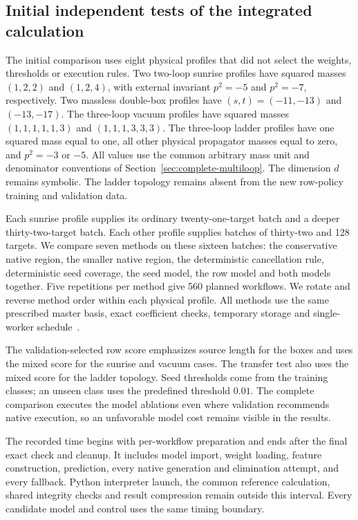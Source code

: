 \subsection{Initial independent tests of the integrated calculation}
The initial comparison uses eight physical profiles that did not select the
weights, thresholds or execution rules. Two two-loop sunrise profiles have
squared masses $(1,2,2)$ and $(1,2,4)$, with external invariant $p^2=-5$ and
$p^2=-7$, respectively. Two massless double-box profiles have
$(s,t)=(-11,-13)$ and $(-13,-17)$. The three-loop vacuum profiles have squared
masses $(1,1,1,1,1,3)$ and $(1,1,1,3,3,3)$. The three-loop ladder profiles have
one squared mass equal to one, all other physical propagator masses equal
to zero, and $p^2=-3$ or $-5$. All values use the common arbitrary mass unit
and denominator conventions of Section~\ref{sec:complete-multiloop}.
The dimension $d$ remains symbolic. The ladder topology remains absent
from the new row-policy training and validation data.

Each sunrise profile supplies its ordinary twenty-one-target batch and
a deeper thirty-two-target batch. Each other profile supplies batches of
thirty-two and 128 targets. We compare seven methods on these sixteen
batches: the conservative native region, the smaller native region,
the deterministic cancellation rule, deterministic seed coverage, the
seed model, the row model and both models together.
Five repetitions per method give 560 planned workflows. We rotate and
reverse method order within each physical profile. All methods use the
same prescribed master basis, exact coefficient checks, temporary storage
and single-worker schedule~\cite{KiraIntegratedRuntimeData}.

The validation-selected row score emphasizes source length for the boxes
and uses the mixed score for the sunrise and vacuum cases. The transfer
test also uses the mixed score for the ladder topology. Seed thresholds
come from the training classes; an unseen class uses the predefined
threshold $0.01$. The complete comparison executes the model ablations
even where validation recommends native execution, so an unfavorable model
cost remains visible in the results.

The recorded time begins with per-workflow preparation and ends after
the final exact check and cleanup. It includes model import, weight loading,
feature construction, prediction, every native generation and elimination
attempt, and every fallback. Python interpreter launch, the common reference
calculation, shared integrity checks and result compression remain outside
this interval. Every candidate model and control uses the same timing
boundary.

